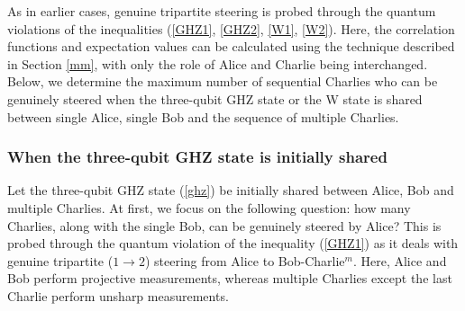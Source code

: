 \documentclass[pra,a4paper,aps,twocolumn,showpacs,superscriptaddress,groupedaddress]{revtex4}
\begin{document}


As in earlier cases, genuine tripartite steering is probed through the quantum violations of the inequalities (\ref{GHZ1}, \ref{GHZ2}, \ref{W1}, \ref{W2}). Here, the correlation functions and expectation values can be calculated using the technique described in Section \ref{mm}, with only the role of Alice and Charlie being interchanged. Below, we determine the maximum number of sequential Charlies who can be genuinely steered when the three-qubit GHZ state or the W state is  shared between single Alice, single Bob and the sequence of multiple Charlies. %

 

\subsubsection{When the three-qubit GHZ state is initially shared}\label{sub11}
Let the three-qubit GHZ state (\ref{ghz}) be initially shared between Alice, Bob and multiple Charlies. At first, we  focus on the  following question: how many Charlies, along with the single Bob, can be  genuinely steered by Alice? This is probed through the quantum violation of the inequality (\ref{GHZ1}) as it deals with genuine tripartite ($1 \rightarrow 2$) steering from Alice to Bob-Charlie$^m$. Here, Alice and Bob perform projective measurements, whereas multiple Charlies except the last Charlie perform unsharp measurements. 
\end{document}
